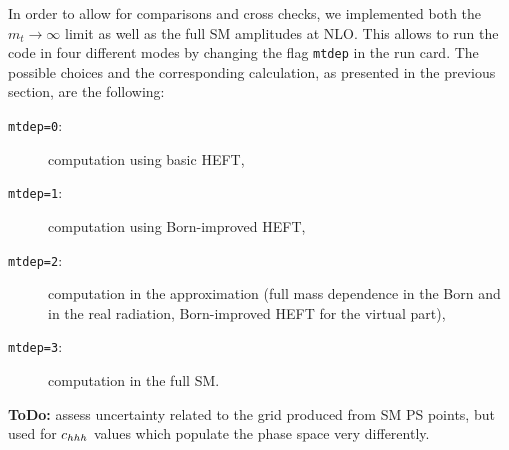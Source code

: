 In order to allow for comparisons and cross checks, we implemented
both the $m_t\to\infty$ limit as well as the full SM amplitudes at
NLO. This allows to run the code in four different modes by changing
the flag {\tt mtdep} in the \powhegbox{} run card. The possible
choices and the corresponding calculation, as presented in the
previous section, are the following:
\begin{description}
 \item[{\tt mtdep=0}:]{computation using basic HEFT,}
 \item[{\tt mtdep=1}:]{computation using Born-improved HEFT,}
 \item[{\tt mtdep=2}:]{computation in the approximation \ftapprox (full
   mass dependence in the Born and in the real radiation, Born-improved HEFT
   for the virtual part),}
 \item[{\tt mtdep=3}:]{computation in the full SM.}
\end{description}

\vspace*{1cm}


{\bf ToDo:} assess uncertainty related to the grid produced from SM PS points, but used for $c_{hhh}$ values which populate the phase space very differently.
